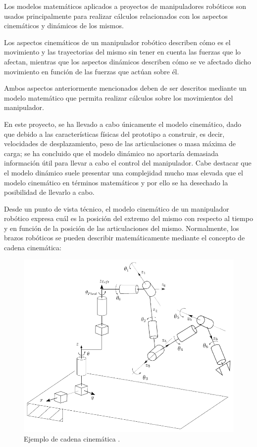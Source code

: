 Los modelos matemáticos aplicados a proyectos de manipuladores robóticos son usados principalmente para realizar cálculos relacionados con los aspectos cinemáticos y dinámicos de los mismos.

Los aspectos cinemáticos de un manipulador robótico describen cómo es el movimiento y las trayectorias del mismo sin tener en cuenta las fuerzas que lo afectan, mientras que los aspectos dinámicos describen cómo se ve afectado dicho movimiento en función de las fuerzas que actúan sobre él.

Ambos aspectos anteriormente mencionados deben de ser descritos mediante un modelo matemático que permita realizar cálculos sobre los movimientos del manipulador. 

En este proyecto, se ha llevado a cabo únicamente el modelo cinemático, dado que debido a las características físicas del prototipo a construir, es decir, velocidades de desplazamiento, peso de las articulaciones o masa máxima de carga; se ha concluido que el modelo dinámico no aportaría demasiada información útil para llevar a cabo el control del manipulador. Cabe destacar que el modelo dinámico suele presentar una complejidad mucho mas elevada que el modelo cinemático en términos matemáticos y por ello se ha desechado la posibilidad de llevarlo a cabo.

Desde un punto de vista técnico, el modelo cinemático de un manipulador robótico expresa cuál es la posición del extremo del mismo con respecto al tiempo y en función de la posición de las articulaciones del mismo. Normalmente, los brazos robóticos se pueden describir matemáticamente mediante el concepto de cadena cinemática:

\begin{figure}[ht!]
    \centering 
    \includegraphics[width=.6\linewidth]{pictures/kinematic chain.png}
    \caption{Ejemplo de cadena cinemática \cite{sharmaGeneralizedUnifiedClosed2017}.}
    \label{fig:chains}
\end{figure}

